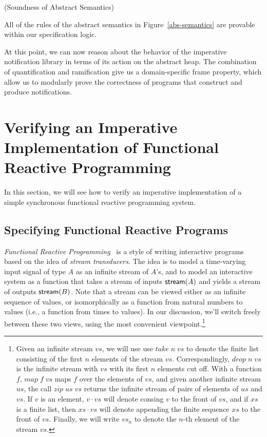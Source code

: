 \documentclass[preprint,natbib]{sigplanconf}
\begin{document}
\begin{prop}{(Soundness of Abstract Semantics)}

All of the rules of the abstract semantics in Figure~\ref{abs-semantics} are
provable within our specification logic. 
\end{prop}

At this point, we can now reason about the behavior of the imperative
notification library in terms of its action on the abstract heap. The
combination of quantification and ramification give us a domain-specific 
frame property, which allow us to modularly prove the correctness of programs 
that construct and produce notifications.

\section{Verifying an Imperative Implementation of Functional Reactive Programming}

In this section, we will see how to verify an imperative
implementation of a simple synchronous functional reactive programming
system.

\subsection{Specifying Functional Reactive Programs}

\emph{Functional Reactive Programming}~\cite{frp} is a style of
writing interactive programs based on the idea of \emph{stream
  transducers}.  The idea is to model a time-varying input signal of
type $A$ as an infinite stream of $A$'s, and to model an interactive
system as a function that takes a stream of inputs $\mbox{\textsf{{stream}}}({A})$ and
yields a stream of outputs $\mbox{\textsf{{stream}}}({B})$. Note that a stream can be
viewed either as an infinite sequence of values, or isomorphically as
a function from natural numbers to values (i.e., a function from times
to values). In our discussion, we'll switch freely between these two
views, using the most convenient viewpoint.\footnote{Given an infinite stream $vs$, we will use use $take\;n\;vs$ to denote
the finite list consisting of the first $n$ elements of the stream
$vs$. Correspondingly, $drop\;n\;vs$ is the infinite stream with $vs$
with its first $n$ elements cut off. With a function $f$, $map\;f\;vs$
maps $f$ over the elements of $vs$, and given another infinite stream
$us$, the call $zip\;us\;vs$ returns the infinite stream of pairs of
elements of $us$ and $vs$. If $v$ is an element, $v \cdot vs$ will 
denote consing $v$ to the front of $vs$, and if $xs$ is a finite list, then
$xs \cdot vs$ will denote appending the finite sequence $xs$ to the
front of $vs$. Finally, we will write $vs_n$ to denote the $n$-th element
of the stream $vs$.}
\end{document}
